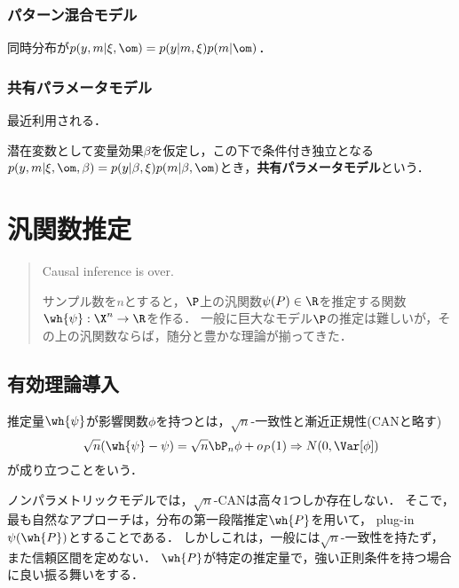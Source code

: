 \documentclass[uplatex,dvipdfmx]{jsreport}
\begin{document}
\subsection{パターン混合モデル}

\begin{definition}
    同時分布が$p(y,m|\xi,\om)=p(y|m,\xi)p(m|\om)$．
\end{definition}

\subsection{共有パラメータモデル}

\begin{tcolorbox}[colframe=ForestGreen, colback=ForestGreen!10!white,breakable,colbacktitle=ForestGreen!40!white,coltitle=black,fonttitle=\bfseries\sffamily,
title=]
    最近利用される．
\end{tcolorbox}

\begin{definition}
    潜在変数として変量効果$\beta$を仮定し，この下で条件付き独立となる$p(y,m|\xi,\om,\beta)=p(y|\beta,\xi)p(m|\beta,\om)$とき，\textbf{共有パラメータモデル}という．
\end{definition}

\chapter{汎関数推定}

\begin{quotation}
    Causal inference is over.

    サンプル数を$n$とすると，$\P$上の汎関数$\psi(P)\in\R$を推定する関数$\wh{\psi}:\X^n\to\R$を作る．
    一般に巨大なモデル$\P$の推定は難しいが，その上の汎関数ならば，随分と豊かな理論が揃ってきた．
\end{quotation}

\section{有効理論導入}

\begin{definition}\label{def-IF-for-estimator}
    推定量$\wh{\psi}$が影響関数$\phi$を持つとは，$\sqrt{n}$-一致性と漸近正規性(CANと略す)
    \[\sqrt{n}(\wh{\psi}-\psi)=\sqrt{n}\bP_n\phi +o_P(1)\Rightarrow N(0,\Var[\phi])\]
    が成り立つことをいう．
\end{definition}
\begin{remark}
    ノンパラメトリックモデルでは，$\sqrt{n}$-CANは高々1つしか存在しない．
    そこで，最も自然なアプローチは，分布の第一段階推定$\wh{P}$を用いて，
    plug-in $\psi(\wh{P})$とすることである．
    しかしこれは，一般には$\sqrt{n}$-一致性を持たず，また信頼区間を定めない．
    $\wh{P}$が特定の推定量で，強い正則条件を持つ場合に良い振る舞いをする．
\end{remark}
\end{document}

